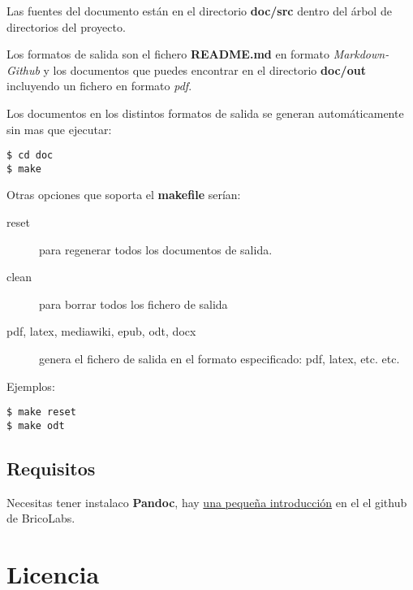 \documentclass[12pt,spanish,]{scrartcl}
\begin{document}
Las fuentes del documento están en el directorio \textbf{doc/src} dentro
del árbol de directorios del proyecto.

Los formatos de salida son el fichero \textbf{README.md} en formato
\emph{Markdown-Github} y los documentos que puedes encontrar en el
directorio \textbf{doc/out} incluyendo un fichero en formato \emph{pdf}.

Los documentos en los distintos formatos de salida se generan
automáticamente sin mas que ejecutar:

\begin{verbatim}
$ cd doc
$ make
\end{verbatim}

Otras opciones que soporta el \textbf{makefile} serían:

\begin{description}
\item[reset]
para regenerar todos los documentos de salida.
\item[clean]
para borrar todos los fichero de salida
\item[pdf, latex, mediawiki, epub, odt, docx]
genera el fichero de salida en el formato especificado: pdf, latex, etc.
etc.
\end{description}

Ejemplos:

\begin{verbatim}
$ make reset
$ make odt
\end{verbatim}

\hypertarget{requisitos}{%
\subsection{Requisitos}\label{requisitos}}

Necesitas tener instalaco \textbf{Pandoc}, hay
\href{https://github.com/brico-labs/pandoc_basico}{una pequeña
introducción} en el el github de BricoLabs.

\hypertarget{licencia}{%
\section{Licencia}\label{licencia}}
\end{document}
